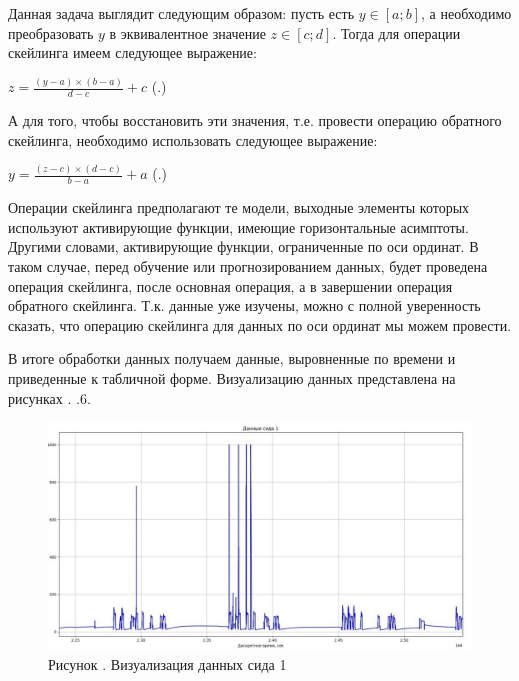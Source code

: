   \par \redline Данная задача выглядит следующим образом: пусть есть $y \in \left[a; b\right]$, а необходимо преобразовать $y$ в эквивалентное значение $z \in \left[c; d\right]$. Тогда для операции скейлинга имеем следующее выражение:

  	\formulaspace \par \redline 
  $ z = \frac{\left(y - a\right) \times \left(b - a\right)}{d - c} + c $
  \hfill (\thechaptercntr .\theformulacntr) \redline
  \formulaspace \addtocounter{formulacntr}{1}
  

  \par \redline А для того, чтобы восстановить эти значения, т.е. провести операцию обратного скейлинга, необходимо использовать следующее выражение: 

	\formulaspace \par \redline 
$ y = \frac{\left(z - c\right) \times \left(d - c\right)}{b - a} + a $
\hfill (\thechaptercntr .\theformulacntr) \redline
\formulaspace \addtocounter{formulacntr}{1}

  \par \redline Операции скейлинга предполагают те модели, выходные элементы которых используют активирующие функции, имеющие горизонтальные асимптоты. Другими словами, активирующие функции, ограниченные по оси ординат. В таком случае, перед обучение или прогнозированием данных, будет проведена операция скейлинга, после основная операция, а в завершении операция обратного скейлинга. Т.к. данные уже изучены, можно с полной уверенность сказать, что операцию скейлинга для данных по оси ординат мы можем провести.
  
  \par \redline В итоге обработки данных получаем данные, выровненные по времени и приведенные к табличной форме. Визуализацию данных представлена на рисунках \thechaptercntr.\theimagecntr {--} \thechaptercntr.6.

  \par
  
    \begin{figure}
  	\centering
  	\def\svgwidth{\textwidth}
  	\includegraphics[scale=0.8]{images/data_1_visual_2.jpg}
  	\caption*{\gostFont Рисунок \thechaptercntr .\theimagecntr \spc {--} Визуализация данных сида 1}
  	\label{fig:MLADBlackBox}
  \end{figure} \addtocounter{imagecntr}{1}
  
